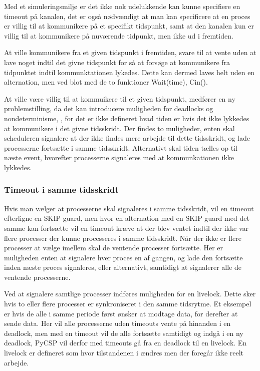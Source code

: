 Med et simuleringsmiljø er det ikke nok udelukkende kan kunne specifiere en 
timeout på kanalen, det er også nødvændigt at man kan specificere at en proces 
er villig til at kommunikere på et specifikt tidspunkt, samt at den kanalen 
kun er villig til at kommunikere på nuværende tidpunkt, men ikke ud 
i fremtiden.  

At ville kommunikere fra et given tidspunkt i fremtiden,  svare til at vente 
uden at lave noget indtil det givne tidspunkt for så at forsøge at kommunikere 
fra tidpunktet indtil kommunktationen lykedes. Dette kan dermed laves helt 
uden en alternation, men ved blot med de to funktioner Wait(time), Cin(). 

At ville være villig til at kommuikere til et given tidspunkt, medfører en ny 
problemstilling, da det kan introducere muligheden for deadlocks og 
nondeterminisme, , for det er ikke defineret hvad 
tiden er hvis det ikke lykkedes at kommunikere i det givne tidsskridt. Der 
findes to muligheder, enten skal scheduleren signalere at der ikke findes mere 
arbejde til dette tidsskridt, og lade processerne fortsætte i samme 
tidsskridt. Alternativt skal tiden tælles op til næste event, hvorefter 
processerne signaleres med at kommunkationen ikke lykkedes. 

\subsubsection{Timeout i samme tidsskridt}
Hvis man vælger at processerne skal signaleres i samme tidsskridt, vil en 
timeout efterligne en SKIP guard, men hvor en alternation med en SKIP guard 
med det samme kan fortsætte vil en timeout kræve at der blev ventet indtil der 
ikke var flere processer der kunne processeres i samme tidsskridt. Når der 
ikke er flere processer at vælge imellem skal de ventende processer fortsætte. 
Her er muligheden enten at signalere hver proces en af gangen, og lade den 
fortsætte inden næste proces signaleres, eller alternativt, samtidigt at 
signalerer alle de ventende processerne.

Ved at signalere samtlige processer indføres muligheden for en livelock. Dette
sker hvis to eller flere processer er  synkroniseret i den samme tidsrytme.
Et eksempel er hvis de alle i samme periode først ønsker at modtage data, for 
derefter at sende data. Her vil alle processerne uden timeouts vente på 
hinanden i en deadlock, men med en timeout vil de alle fortsætte samtidigt og 
indgå i en ny deadlock, PyCSP vil derfor med timeouts gå fra en deadlock til 
en livelock. En livelock er defineret som hvor tilstandenen i ændres men der
foregår ikke reelt arbejde. 

